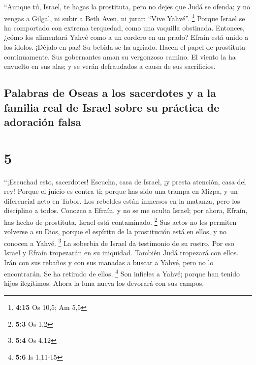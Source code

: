  ``Aunque tú, Israel, te hagas la prostituta, pero no
dejes que Judá se ofenda; y no vengas a Gilgal, ni subir a Beth Aven, ni
jurar: ``Vive Yahvé''. \footnote{\textbf{4:15} Os 10,5; Am 5,5}
 Porque Israel se ha comportado con extrema terquedad,
como una vaquilla obstinada. Entonces, ¿cómo los alimentará Yahvé como a
un cordero en un prado?  Efraín está unido a los ídolos.
¡Déjalo en paz!  Su bebida se ha agriado. Hacen el papel
de prostituta continuamente. Sus gobernantes aman su vergonzoso camino.
 El viento la ha envuelto en sus alas; y se verán
defraudados a causa de sus sacrificios.

\hypertarget{palabras-de-oseas-a-los-sacerdotes-y-a-la-familia-real-de-israel-sobre-su-pruxe1ctica-de-adoraciuxf3n-falsa}{%
\subsection{Palabras de Oseas a los sacerdotes y a la familia real de
Israel sobre su práctica de adoración
falsa}\label{palabras-de-oseas-a-los-sacerdotes-y-a-la-familia-real-de-israel-sobre-su-pruxe1ctica-de-adoraciuxf3n-falsa}}

\hypertarget{section-4}{%
\section{5}\label{section-4}}

 ``¡Escuchad esto, sacerdotes! Escucha, casa de Israel, ¡y
presta atención, casa del rey! Porque el juicio es contra ti; porque has
sido una trampa en Mizpa, y un diferencial neto en Tabor. 
Los rebeldes están inmersos en la matanza, pero los disciplino a todos.
 Conozco a Efraín, y no se me oculta Israel; por ahora,
Efraín, has hecho de prostituta. Israel está contaminado. \footnote{\textbf{5:3}
  Os 1,2}  Sus actos no les permiten volverse a su Dios,
porque el espíritu de la prostitución está en ellos, y no conocen a
Yahvé. \footnote{\textbf{5:4} Os 4,12}  La soberbia de
Israel da testimonio de su rostro. Por eso Israel y Efraín tropezarán en
su iniquidad. También Judá tropezará con ellos.  Irán con
sus rebaños y con sus manadas a buscar a Yahvé, pero no lo encontrarán.
Se ha retirado de ellos. \footnote{\textbf{5:6} Is 1,11-15}
 Son infieles a Yahvé; porque han tenido hijos ilegítimos.
Ahora la luna nueva los devorará con sus campos.

